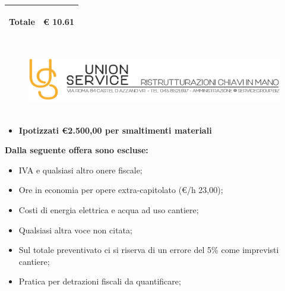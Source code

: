 \documentclass[a4paper]{article}
\begin{document}
                                                        \noindent\begin{tabular}{|L{133.1mm} |  L{16mm}| }
                                                        \hline
                                                          \vspace{2.5mm}
                                                          \begin{spacing}{0}
                                                            \textbf{Totale}
                                                          \end{spacing} &
                                                        \vspace{2.5mm}
                                                        \begin{spacing}{0}
                                                          \euro\hfill
                                                     10.61
                                                        \end{spacing}\\
                                                        \hline
                                                        \end{tabular}
                               \newpage
                            \begin{figure}[!t]
                            \includegraphics[width=15.8cm, height=3cm]{intestazioneAlta2.jpg}
                            \end{figure}
                         
                        \begin{itemize}
                            \item \textbf{Ipotizzati \euro 2.500,00 per smaltimenti materiali}
                        \end{itemize}

                        \noindent\textbf{Dalla seguente offera sono escluse:}
                        \begin{itemize}
                            \item IVA e qualsiasi altro onere fiscale;
                            \item Ore in economia per opere extra-capitolato (\euro/h 23,00);
                            \item Costi di energia elettrica e acqua ad uso cantiere;
                            \item Qualsiasi altra voce non citata;
                            \item Sul totale preventivato ci si riserva di un errore del 5\% come imprevisti cantiere;
                            \item Pratica per detrazioni fiscali da quantificare;
                        \end{itemize}
\end{document}

